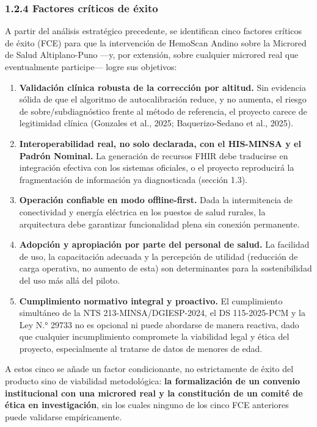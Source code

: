 \documentclass[11pt,a4paper]{article}
\providecommand{\tightlist}{%
  \setlength{\itemsep}{0pt}\setlength{\parskip}{0pt}}
\begin{document}
\subsubsection{1.2.4 Factores críticos de éxito}\label{factores-cruxedticos-de-uxe9xito}

A partir del análisis estratégico precedente, se identifican cinco factores críticos de éxito (FCE) para que la intervención de HemoScan Andino sobre la Microred de Salud Altiplano-Puno ---y, por extensión, sobre cualquier microred real que eventualmente participe--- logre sus objetivos:

\begin{enumerate}
\def\labelenumi{\arabic{enumi}.}
\tightlist
\item
  \textbf{Validación clínica robusta de la corrección por altitud.} Sin evidencia sólida de que el algoritmo de autocalibración reduce, y no aumenta, el riesgo de sobre/subdiagnóstico frente al método de referencia, el proyecto carece de legitimidad clínica (Gonzales et al., 2025; Baquerizo-Sedano et al., 2025).
\item
  \textbf{Interoperabilidad real, no solo declarada, con el HIS-MINSA y el Padrón Nominal.} La generación de recursos FHIR debe traducirse en integración efectiva con los sistemas oficiales, o el proyecto reproducirá la fragmentación de información ya diagnosticada (sección 1.3).
\item
  \textbf{Operación confiable en modo offline-first.} Dada la intermitencia de conectividad y energía eléctrica en los puestos de salud rurales, la arquitectura debe garantizar funcionalidad plena sin conexión permanente.
\item
  \textbf{Adopción y apropiación por parte del personal de salud.} La facilidad de uso, la capacitación adecuada y la percepción de utilidad (reducción de carga operativa, no aumento de esta) son determinantes para la sostenibilidad del uso más allá del piloto.
\item
  \textbf{Cumplimiento normativo integral y proactivo.} El cumplimiento simultáneo de la NTS 213-MINSA/DGIESP-2024, el DS 115-2025-PCM y la Ley N.° 29733 no es opcional ni puede abordarse de manera reactiva, dado que cualquier incumplimiento compromete la viabilidad legal y ética del proyecto, especialmente al tratarse de datos de menores de edad.
\end{enumerate}

A estos cinco se añade un factor condicionante, no estrictamente de éxito del producto sino de viabilidad metodológica: \textbf{la formalización de un convenio institucional con una microred real y la constitución de un comité de ética en investigación}, sin los cuales ninguno de los cinco FCE anteriores puede validarse empíricamente.
\end{document}

